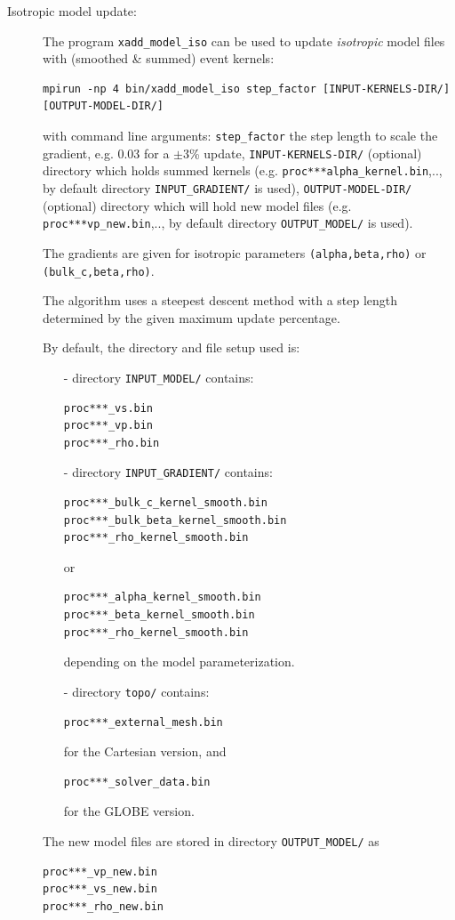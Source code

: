 \begin{description}
\item [Isotropic model update:] The program \texttt{xadd\_model\_iso} can be used to update {\it isotropic} model files with
(smoothed \& summed) event kernels:
\begin{verbatim}
mpirun -np 4 bin/xadd_model_iso step_factor [INPUT-KERNELS-DIR/] [OUTPUT-MODEL-DIR/]
\end{verbatim}
with command line arguments:
\texttt{step\_factor} the step length to scale the gradient, e.g. $0.03$ for a $\pm 3$\% update,
\texttt{INPUT-KERNELS-DIR/} (optional) directory which holds summed kernels (e.g. \texttt{proc***alpha\_kernel.bin},.., by default
directory \texttt{INPUT\_GRADIENT/} is used),
\texttt{OUTPUT-MODEL-DIR/} (optional) directory which will hold new model files (e.g. \texttt{proc***vp\_new.bin},.., by default directory
\texttt{OUTPUT\_MODEL/} is used).

The gradients are given for isotropic parameters \texttt{(alpha,beta,rho)} or \texttt{(bulk\_c,beta,rho)}.

The algorithm uses a steepest descent method with a step length
determined by the given maximum update percentage.

By default, the directory and file setup used is:
\begin{itemize}
\item [-] directory \texttt{INPUT\_MODEL/} contains:
\begin{verbatim}
proc***_vs.bin
proc***_vp.bin
proc***_rho.bin
\end{verbatim}

\item [-] directory \texttt{INPUT\_GRADIENT/} contains:
\begin{verbatim}
proc***_bulk_c_kernel_smooth.bin
proc***_bulk_beta_kernel_smooth.bin
proc***_rho_kernel_smooth.bin
\end{verbatim}
or
\begin{verbatim}
proc***_alpha_kernel_smooth.bin
proc***_beta_kernel_smooth.bin
proc***_rho_kernel_smooth.bin
\end{verbatim}
depending on the model parameterization.

\item [-] directory \texttt{topo/} contains:
\begin{verbatim}
proc***_external_mesh.bin
\end{verbatim}
for the Cartesian version, and
\begin{verbatim}
proc***_solver_data.bin
\end{verbatim}
for the GLOBE version.
\end{itemize}

\noindent
The new model files are stored in directory \texttt{OUTPUT\_MODEL/} as
\begin{verbatim}
proc***_vp_new.bin
proc***_vs_new.bin
proc***_rho_new.bin
\end{verbatim}

\end{description}

